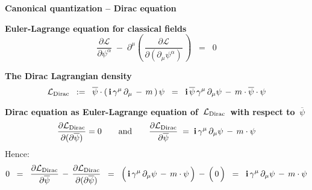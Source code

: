 
\begin{frame}{\headingColor\bf\Large Canonical quantization -- Dirac equation}

\small

\vskip 0.5cm
\textbf{Euler-Lagrange equation for classical fields}
\begin{equation*}
\dfrac{\partial\mathcal{L}}{\partial\psi^{\alpha}}
\;-\; \partial^{\mu}\!\left(\,\dfrac{\partial\mathcal{L}}{\partial(\partial_{\mu}\psi^{\alpha})}\,\right)
\;\; = \;\; 0
\end{equation*}

\vskip 0.3cm
\textbf{The Dirac Lagrangian density}
\begin{equation*}
\mathcal{L}_{\textnormal{Dirac}}
\;\; := \;\;
	\overline{\psi}\cdot\left(\,\textnormal{\bf i}\,\gamma^{\mu}\,\partial_{\mu}\,-\,m\,\right)\psi
\;\; = \;\;
	\textnormal{\bf i}\,\overline{\psi}\,\gamma^{\mu}\,\partial_{\mu}\psi \,-\, m\cdot\overline{\psi}\cdot\psi
\end{equation*}

\vskip 0.3cm
\textbf{Dirac equation as Euler-Lagrange equation of
\,$\mathcal{L}_{\textnormal{Dirac}}$\,
{\color{red}with respect to \,$\overline{\psi}$}
}
\begin{equation*}
\dfrac{\partial\mathcal{L}_{\textnormal{Dirac}}}{\partial(\partial\overline{\psi})} = 0
\quad\quad\textnormal{and}\quad\quad
\dfrac{\partial\mathcal{L}_{\textnormal{Dirac}}}{\partial\overline{\psi}}
\;=\; \textnormal{\bf i}\,\gamma^{\mu}\,\partial_{\mu}\psi \,-\, m\cdot\psi
\end{equation*}
Hence:
\begin{equation*}
0
\;\; = \;\;
	\dfrac{\partial\mathcal{L}_{\textnormal{Dirac}}}{\partial\overline{\psi}}
	\,-\,
	\dfrac{\partial\mathcal{L}_{\textnormal{Dirac}}}{\partial(\partial\overline{\psi})}
\;\; = \;\;
	\left(\,\overset{{\color{white}.}}{\i}\,\gamma^{\mu}\,\partial_{\mu}\psi \,-\, m\cdot\psi\,\right)
	\,-\,
	\left(\,\overset{{\color{white}.}}{0}\,\right)
\;\; = \;\;
	\i\,\gamma^{\mu}\,\partial_{\mu}\psi \,-\, m\cdot\psi
\end{equation*}

\end{frame}
\normalsize

